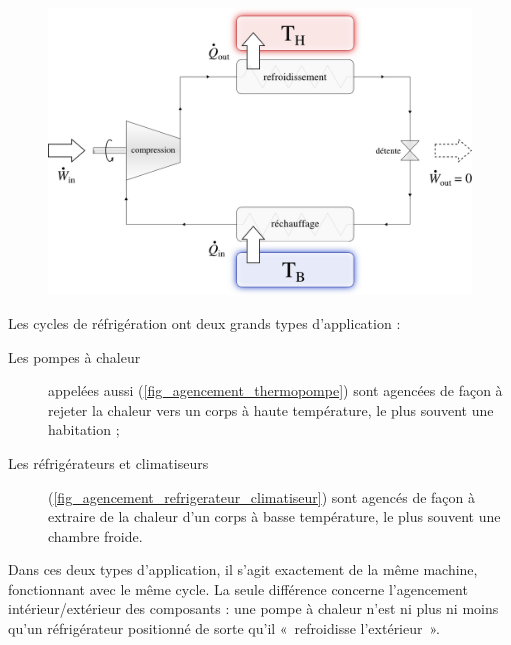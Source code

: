 			\begin{figure}
				\begin{center}
					\includegraphics[width=\textwidth]{images/refrigerateur_climatiseur_thermopompe_so_soupape.png}
				\end{center}
				\label{fig_principe_du_réfrigérateur_soupape}
			\end{figure}

			\clearfloats
			Les cycles de réfrigération ont deux grands types d’application :
			\begin{description}
				\item[Les pompes à chaleur] appelées aussi  (\cref{fig_agencement_thermopompe}) sont agencées de façon à rejeter la chaleur vers un corps à haute température, le plus souvent une habitation ;
				\item[Les réfrigérateurs et climatiseurs] (\cref{fig_agencement_refrigerateur_climatiseur}) sont agencés de façon à extraire de la chaleur d’un corps à basse température, le plus souvent une chambre froide.
			\end{description}

			Dans ces deux types d’application, il s’agit exactement de la même machine, fonctionnant avec le même cycle. La seule différence concerne l’agencement intérieur/extérieur des composants : une pompe à chaleur n’est ni plus ni moins qu’un réfrigérateur positionné de sorte qu’il «~refroidisse l’extérieur~».

